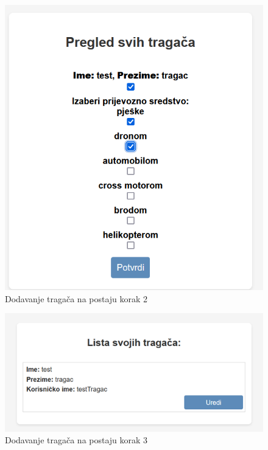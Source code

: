 			\begin{figure}[H]
				\includegraphics[scale=0.62]{slike/Dodavanje tragača na postaju korak 2.png}
				\centering
				\caption{Dodavanje tragača na postaju korak 2}
				\label{fig:Dodavanje tragača na postaju korak 2}
			\end{figure}

			\begin{figure}[H]
				\includegraphics[scale=0.85]{slike/Dodavanje tragača na postaju korak 3.png}
				\centering
				\caption{Dodavanje tragača na postaju korak 3}
				\label{fig:Dodavanje tragača na postaju korak 3}
			\end{figure}


